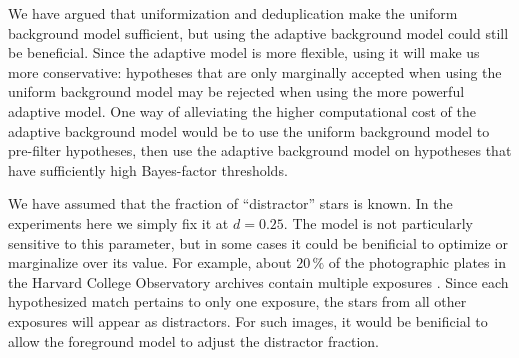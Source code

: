 We have argued that uniformization and deduplication make the uniform
background model sufficient, but using the adaptive background model
could still be beneficial.  Since the adaptive model is more flexible,
using it will make us more conservative: hypotheses that are only
marginally accepted when using the uniform background model may be
rejected when using the more powerful adaptive model.  One way of
alleviating the higher computational cost of the adaptive background
model would be to use the uniform background model to pre-filter
hypotheses, then use the adaptive background model on hypotheses that
have sufficiently high Bayes-factor thresholds.


We have assumed that the fraction of ``distractor'' stars is known.
In the experiments here we simply fix it at $d = 0.25$.  The model is
not particularly sensitive to this parameter, but in some cases it
could be benificial to optimize or marginalize over its value.  For
example, about $20\,\percent$ of the photographic plates in the Harvard
College Observatory archives contain multiple exposures \cite{dasch}.
Since each hypothesized match pertains to only one exposure, the stars
from all other exposures will appear as distractors.  For such images,
it would be benificial to allow the foreground model to adjust the
distractor fraction.















